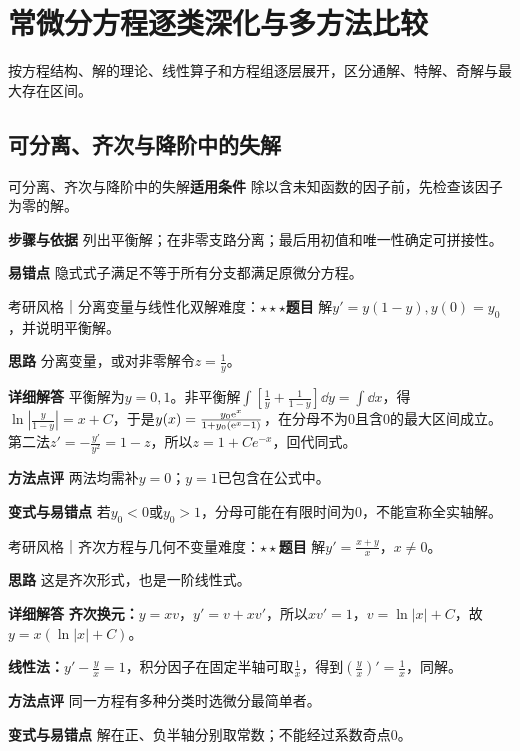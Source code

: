 \section{常微分方程逐类深化与多方法比较}\label{deep:ode_source_deep}

\begin{examtip}按方程结构、解的理论、线性算子和方程组逐层展开，区分通解、特解、奇解与最大存在区间。\end{examtip}

\subsection{可分离、齐次与降阶中的失解}\label{deep:ode_source_deep:lost}

\begin{method}{可分离、齐次与降阶中的失解}\textbf{适用条件} 除以含未知函数的因子前，先检查该因子为零的解。\par\textbf{步骤与依据} 列出平衡解；在非零支路分离；最后用初值和唯一性确定可拼接性。\par\textbf{易错点} 隐式式子满足不等于所有分支都满足原微分方程。\end{method}

\begin{example}{考研风格｜分离变量与线性化双解}{难度：$\star\star\star$}\label{deep:ex:ode_source_deep:logistic}\textbf{题目} 解$y'=y(1-y),y(0)=y_0$，并说明平衡解。\par\textbf{思路} 分离变量，或对非零解令$z=\frac{1}{y}$。\par\textbf{详细解答} 平衡解为$y=0,1$。非平衡解$\int[\frac1y+\frac1{1-y}]\dd y=\int\dd x$，得$\ln|\frac{y}{1-y}|=x+C$，于是$y(x)=\frac{y_0\mathrm{e}^x}{1+y_0(\mathrm{e}^x-1)}$，在分母不为0且含0的最大区间成立。第二法$z'=-\frac{y'}{y^2}=1-z$，所以$z=1+Ce^{-x}$，回代同式。\par\textbf{方法点评} 两法均需补$y=0$；$y=1$已包含在公式中。\par\textbf{变式与易错点} 若$y_0<0$或$y_0>1$，分母可能在有限时间为0，不能宣称全实轴解。\end{example}

\begin{example}{考研风格｜齐次方程与几何不变量}{难度：$\star\star$}\label{deep:ex:ode_source_deep:homogeneous}\textbf{题目} 解$y'=\frac{x+y}{x}$，$x\ne0$。\par\textbf{思路} 这是齐次形式，也是一阶线性式。\par\textbf{详细解答} \textbf{齐次换元：}$y=xv$，$y'=v+xv'$，所以$xv'=1$，$v=\ln|x|+C$，故$y=x(\ln|x|+C)$。\par\textbf{线性法：}$y'-\frac{y}{x}=1$，积分因子在固定半轴可取$\frac{1}{x}$，得到$(\frac{y}{x})'=\frac{1}{x}$，同解。\par\textbf{方法点评} 同一方程有多种分类时选微分最简单者。\par\textbf{变式与易错点} 解在正、负半轴分别取常数；不能经过系数奇点0。\end{example}

